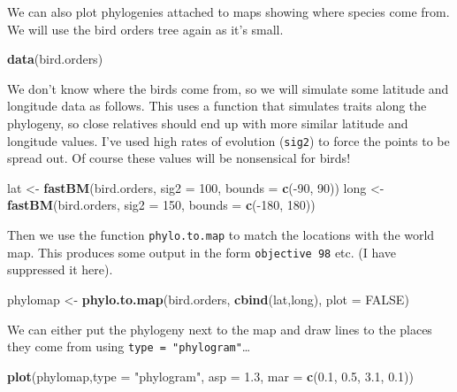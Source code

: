 \documentclass[]{book}
\newenvironment{Shaded}{\begin{snugshade}}{\end{snugshade}}
\newcommand{\KeywordTok}[1]{\textcolor[rgb]{0.13,0.29,0.53}{\textbf{{#1}}}}
\newcommand{\DataTypeTok}[1]{\textcolor[rgb]{0.13,0.29,0.53}{{#1}}}
\newcommand{\DecValTok}[1]{\textcolor[rgb]{0.00,0.00,0.81}{{#1}}}
\newcommand{\FloatTok}[1]{\textcolor[rgb]{0.00,0.00,0.81}{{#1}}}
\newcommand{\StringTok}[1]{\textcolor[rgb]{0.31,0.60,0.02}{{#1}}}
\newcommand{\OtherTok}[1]{\textcolor[rgb]{0.56,0.35,0.01}{{#1}}}
\newcommand{\NormalTok}[1]{{#1}}
\theoremstyle{definition}
\theoremstyle{definition}
\theoremstyle{definition}
\theoremstyle{remark}
\begin{document}
We can also plot phylogenies attached to maps showing where species come
from. We will use the bird orders tree again as it's small.

\begin{Shaded}
\begin{Highlighting}[]
\KeywordTok{data}\NormalTok{(bird.orders)}
\end{Highlighting}
\end{Shaded}

We don't know where the birds come from, so we will simulate some
latitude and longitude data as follows. This uses a function that
simulates traits along the phylogeny, so close relatives should end up
with more similar latitude and longitude values. I've used high rates of
evolution (\texttt{sig2}) to force the points to be spread out. Of
course these values will be nonsensical for birds!

\begin{Shaded}
\begin{Highlighting}[]
\NormalTok{lat <-}\StringTok{ }\KeywordTok{fastBM}\NormalTok{(bird.orders, }\DataTypeTok{sig2 =} \DecValTok{100}\NormalTok{, }\DataTypeTok{bounds =} \KeywordTok{c}\NormalTok{(-}\DecValTok{90}\NormalTok{, }\DecValTok{90}\NormalTok{))}
\NormalTok{long <-}\StringTok{ }\KeywordTok{fastBM}\NormalTok{(bird.orders, }\DataTypeTok{sig2 =} \DecValTok{150}\NormalTok{, }\DataTypeTok{bounds =} \KeywordTok{c}\NormalTok{(-}\DecValTok{180}\NormalTok{, }\DecValTok{180}\NormalTok{))}
\end{Highlighting}
\end{Shaded}

Then we use the function \texttt{phylo.to.map} to match the locations
with the world map. This produces some output in the form
\texttt{objective\ 98} etc. (I have suppressed it here).

\begin{Shaded}
\begin{Highlighting}[]
\NormalTok{phylomap <-}\StringTok{ }\KeywordTok{phylo.to.map}\NormalTok{(bird.orders, }\KeywordTok{cbind}\NormalTok{(lat,long), }\DataTypeTok{plot =} \OtherTok{FALSE}\NormalTok{)}
\end{Highlighting}
\end{Shaded}

We can either put the phylogeny next to the map and draw lines to the
places they come from using \texttt{type\ =\ "phylogram"}\ldots{}

\begin{Shaded}
\begin{Highlighting}[]
\KeywordTok{plot}\NormalTok{(phylomap,}\DataTypeTok{type =} \StringTok{"phylogram"}\NormalTok{, }\DataTypeTok{asp =} \FloatTok{1.3}\NormalTok{, }\DataTypeTok{mar =} \KeywordTok{c}\NormalTok{(}\FloatTok{0.1}\NormalTok{, }\FloatTok{0.5}\NormalTok{, }\FloatTok{3.1}\NormalTok{, }\FloatTok{0.1}\NormalTok{))}
\end{Highlighting}
\end{Shaded}
\end{document}
